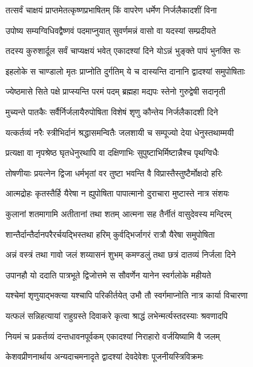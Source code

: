 \twolineshloka
{तत्सर्वं चाक्षयं प्राप्तमेतत्कृष्णप्रभाषितम्}
{किं वापरेण धर्मेण निर्जलैकादशीं विना}%

\twolineshloka
{उपोष्य सम्यग्विधिवद्वैष्णवं पदमाप्नुयात्}
{सुवर्णमन्नं वासो वा यदस्यां सम्प्रदीयते}%

\twolineshloka
{तदस्य कुरुशार्दूल सर्वं चाप्यक्षयं भवेत्}
{एकादश्यां दिने योऽन्नं भुङ्क्ते पापं भुनक्ति सः}%

\twolineshloka
{इहलोके स चाण्डालो मृतः प्राप्नोति दुर्गतिम्}
{ये च दास्यन्ति दानानि द्वादश्यां समुपोषिताः}%

\twolineshloka
{ज्येष्ठमासे सिते पक्षे प्राप्स्यन्ति परमं पदम्}
{ब्रह्महा मद्यपः स्तेनो गुरुद्वेषी सदानृती}%

\twolineshloka
{मुच्यन्ते पातकैः सर्वैर्निर्जलायैरुपोषिता}
{विशेषं शृणु कौन्तेय निर्जलैकादशी दिने}%

\twolineshloka
{यत्कर्तव्यं नरैः स्त्रीभिर्दानं श्रद्धासमन्वितैः}
{जलशायी च सम्पूज्यो देया धेनुस्तथाम्मयी}%

\twolineshloka
{प्रत्यक्षा वा नृपश्रेष्ठ घृतधेनुरथापि वा}
{दक्षिणाभिः सुपुष्टाभिर्मिष्टान्नैश्च पृथग्विधैः}%

\twolineshloka
{तोषणीयाः प्रयत्नेन द्विजा धर्मभृतां वर}
{तुष्टा भवन्ति वै विप्रास्तैस्तुष्टैर्मोक्षदो हरिः}%

\twolineshloka
{आत्मद्रोहः कृतस्तैर्हि यैरेषा न ह्युपोषिता}
{पापात्मानो दुराचारा मुष्टास्ते नात्र संशयः}%

\twolineshloka
{कुलानां शतमागामि अतीतानां तथा शतम्}
{आत्मना सह तैर्नीतं वासुदेवस्य मन्दिरम्}%

\twolineshloka
{शान्तैर्दान्तैर्दानपरैरर्चयद्भिस्तथा हरिम्}
{कुर्वद्भिर्जागरं रात्रौ यैरेषा समुपोषिता}%

\twolineshloka
{अन्नं वस्त्रं तथा गावो जलं शय्यासनं शुभम्}
{कमण्डलुं तथा छत्रं दातव्यं निर्जला दिने}%

\twolineshloka
{उपानहौ यो ददाति पात्रभूते द्विजोत्तमे}
{स सौवर्णेन यानेन स्वर्गलोके महीयते}%

\twolineshloka
{यश्चेमां शृणुयाद्भक्त्या यश्चापि परिकीर्तयेत्}
{उभौ तौ स्वर्गमाप्नोति नात्र कार्या विचारणा}%

\twolineshloka
{यत्फलं सन्निहत्यायां राहुग्रस्ते दिवाकरे}
{कृत्वा श्राद्धं लभेन्मर्त्यस्तदस्याः श्रवणादपि}%

\twolineshloka
{नियमं च प्रकर्तव्यं दन्तधावनपूर्वकम्}
{एकादश्यां निराहारो वर्जयिष्यामि वै जलम्}%

\twolineshloka
{केशवप्रीणनार्थाय अन्यदाचमनादृते}
{द्वादश्यां देवदेवेशः पूजनीयस्त्रिविक्रमः}%

